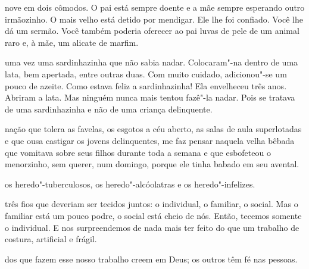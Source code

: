  nove em dois cômodos. O pai está sempre doente e a mãe sempre
esperando outro irmãozinho. O mais velho está detido por mendigar. Ele
lhe foi confiado. Você lhe dá um sermão. Você também poderia oferecer ao
pai luvas de pele de um animal raro e, à mãe, um alicate de marfim.



 uma vez uma sardinhazinha que não sabia nadar. Colocaram"-na dentro
de uma lata, bem apertada, entre outras duas. Com muito cuidado,
adicionou"-se um pouco de azeite. Como estava feliz a sardinhazinha! Ela
envelheceu três anos. Abriram a lata. Mas ninguém nunca mais tentou
fazê"-la nadar. Pois se tratava de uma sardinhazinha e não de uma criança
delinquente.



\pagebreak

 nação que tolera as favelas, os esgotos a céu aberto, as salas de
aula superlotadas e que ousa castigar os jovens delinquentes, me faz
pensar naquela velha bêbada que vomitava sobre seus filhos durante toda
a semana e que esbofeteou o menorzinho, sem querer, num domingo, porque
ele tinha babado em seu avental.




 os heredo"-tuberculosos, os heredo"-alcóolatras e os heredo"-infelizes.




 três fios que deveriam ser tecidos juntos: o individual, o familiar,
o social. Mas o familiar está um pouco podre, o social está cheio de
nós. Então, tecemos somente o individual. E nos surpreendemos de nada
mais ter feito do que um trabalho de costura, artificial e frágil.



 dos que fazem esse nosso trabalho creem em Deus; os outros têm fé
nas pessoas.



\pagebreak
\thispagestyle{empty}

